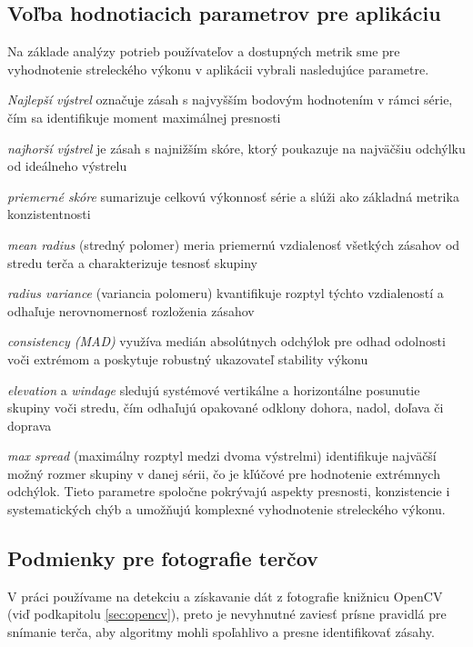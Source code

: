\subsection{Voľba hodnotiacich parametrov pre aplikáciu}

Na základe analýzy potrieb používateľov a dostupných metrik sme pre vyhodnotenie streleckého výkonu v aplikácii vybrali nasledujúce parametre. 

\textit{Najlepší výstrel} označuje zásah s najvyšším bodovým hodnotením v rámci série, čím sa identifikuje moment maximálnej presnosti

\textit{najhorší výstrel} je zásah s najnižším skóre, ktorý poukazuje na najväčšiu odchýlku od ideálneho výstrelu

\textit{priemerné skóre} sumarizuje celkovú výkonnosť série a slúži ako základná metrika konzistentnosti

\textit{mean radius} (stredný polomer) meria priemernú vzdialenosť všetkých zásahov od stredu terča a charakterizuje tesnosť skupiny

\textit{radius variance} (variancia polomeru) kvantifikuje rozptyl týchto vzdialeností a odhaľuje nerovnomernosť rozloženia zásahov

\textit{consistency (MAD)} využíva medián absolútnych odchýlok pre odhad odolnosti voči extrémom a poskytuje robustný ukazovateľ stability výkonu

\textit{elevation} a \textit{windage} sledujú systémové vertikálne a horizontálne posunutie skupiny voči stredu, čím odhaľujú opakované odklony dohora, 
nadol, doľava či doprava

\textit{max spread} (maximálny rozptyl medzi dvoma výstrelmi) identifikuje najväčší možný rozmer skupiny v danej sérii, čo je kľúčové pre hodnotenie 
extrémnych odchýlok. Tieto parametre spoločne pokrývajú aspekty presnosti, konzistencie i systematických chýb a umožňujú komplexné vyhodnotenie streleckého 
výkonu.

\subsection{Podmienky pre fotografie terčov}
V práci používame na detekciu a získavanie dát z fotografie knižnicu OpenCV (viď podkapitolu \ref{sec:opencv}), preto je nevyhnutné zaviesť prísne pravidlá 
pre snímanie terča, aby algoritmy mohli spoľahlivo a presne identifikovať zásahy.

